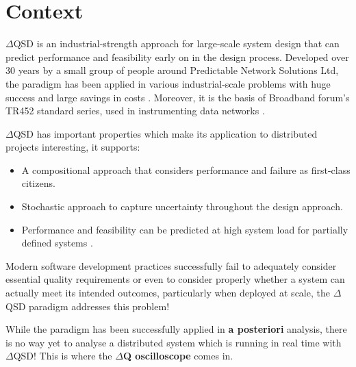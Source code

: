 \section{Context}
    $\Delta$QSD is an industrial-strength approach for large-scale system design that can predict performance and feasibility early on in the design process.  
    Developed over 30 years by a small group of people around Predictable Network Solutions Ltd, the paradigm has been applied in various industrial-scale problems with huge success and large savings in costs \cite{dq-tut}. Moreover, it is the basis of Broadband forum's TR452 standard series, used in instrumenting data networks \cite{dq-br}.
    
  $\Delta$QSD has important properties which make its application to distributed projects interesting, it supports:
    \begin{itemize}
        \item A compositional approach that considers performance and failure as first-class citizens. 
        \item Stochastic approach to capture uncertainty throughout the design approach.
        \item Performance and feasibility can be predicted at high system load for partially defined systems \cite{dq-tut}.
    \end{itemize}

    Modern software development practices successfully fail to adequately consider essential quality requirements or even to consider properly whether a system can actually meet its intended outcomes, particularly when deployed at scale, the $\Delta$QSD paradigm addresses this problem! \cite{art}  
    
    While the paradigm has been successfully applied in \textbf{a posteriori} analysis, there is no way yet to analyse a distributed system which is running in real time with $\Delta$QSD! This is where the \textbf{$\Delta$Q oscilloscope} comes in. 
